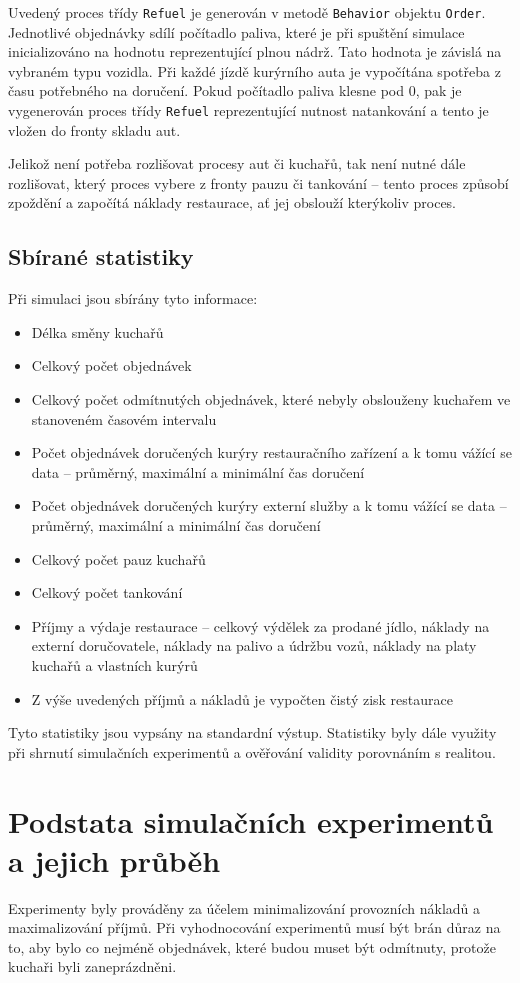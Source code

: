\documentclass[a4paper, 11pt]{article}
\begin{document}
Uvedený proces třídy \texttt{Refuel} je generován v metodě \texttt{Behavior} objektu \texttt{Order}. Jednotlivé objednávky sdílí počítadlo paliva, které je při spuštění simulace inicializováno na hodnotu reprezentující plnou nádrž. Tato hodnota je závislá na vybraném typu vozidla. Při každé jízdě kurýrního auta je vypočítána spotřeba z času potřebného na doručení. Pokud počítadlo paliva klesne pod 0, pak je vygenerován proces třídy \texttt{Refuel} reprezentující nutnost natankování a tento je vložen do fronty skladu aut. 

Jelikož není potřeba rozlišovat procesy aut či kuchařů, tak není nutné dále rozlišovat, který proces vybere z fronty pauzu či tankování -- tento proces způsobí zpoždění a započítá náklady restaurace, ať jej obslouží kterýkoliv proces. 

\subsection{Sbírané statistiky}
Při simulaci jsou sbírány tyto informace:
\begin{itemize}
\item Délka směny kuchařů
\item Celkový počet objednávek
\item Celkový počet odmítnutých objednávek, které nebyly obslouženy kuchařem ve stanoveném časovém intervalu
\item Počet objednávek doručených kurýry restauračního zařízení a k tomu vážící se data -- průměrný, maximální a minimální čas doručení
\item Počet objednávek doručených kurýry externí služby a k tomu vážící se data -- průměrný, maximální a minimální čas doručení
\item Celkový počet pauz kuchařů
\item Celkový počet tankování
\item Příjmy a výdaje restaurace -- celkový výdělek za prodané jídlo, náklady na externí doručovatele, náklady na palivo a údržbu vozů, náklady na platy kuchařů a vlastních kurýrů
\item Z výše uvedených příjmů a nákladů je vypočten čistý zisk restaurace
\end{itemize}
Tyto statistiky jsou vypsány na standardní výstup. Statistiky byly dále využity při shrnutí simulačních experimentů \cite[snímek 165]{IMS_course} a ověřování validity porovnáním s realitou.

\section{Podstata simulačních experimentů a jejich průběh}
Experimenty byly prováděny za účelem minimalizování provozních nákladů a maximalizování příjmů. Při vyhodnocování experimentů musí být brán důraz na to, aby bylo co nejméně objednávek, které budou muset být odmítnuty, protože kuchaři byli zaneprázdněni.
\end{document}
